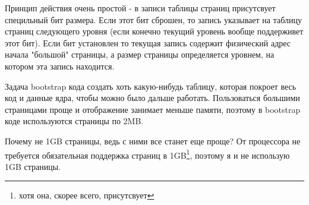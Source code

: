 Принцип действия очень простой - в записи таблицы страниц присутсвует специльный
бит размера. Если этот бит сброшен, то запись указывает на таблицу страниц
следующего уровня (если конечно текущий уровень вообще поддерживет этот бит).
Если бит установлен то текущая запись содержит физический адрес начала "большой"
страницы, а размер страницы определяется уровнем, на котором эта запись
находится.

Задача bootstrap кода создать хоть какую-нибудь таблицу, которая покроет весь
код и данные ядра, чтобы можно было дальше работать. Пользоваться большими
страницами проще и отображение занимает меньше памяти, поэтому в bootstrap коде
используются страницы по 2MB.

Почему не 1GB страницы, ведь с ними все станет еще проще? От процессора не
требуется обязательная поддержка страниц в 1GB\footnote{хотя она, скорее всего,
присутсвует}, поэтому я и не использую 1GB страницы.
